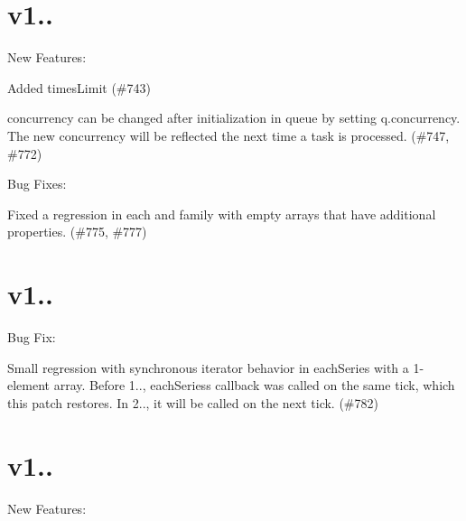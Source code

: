 \section*{v1..}

New Features\+:


\begin{DoxyItemize}
\item Added {\ttfamily times\+Limit} (\#743)
\item {\ttfamily concurrency} can be changed after initialization in {\ttfamily queue} by setting {\ttfamily q.\+concurrency}. The new concurrency will be reflected the next time a task is processed. (\#747, \#772)
\end{DoxyItemize}

Bug Fixes\+:


\begin{DoxyItemize}
\item Fixed a regression in {\ttfamily each} and family with empty arrays that have additional properties. (\#775, \#777)
\end{DoxyItemize}

\section*{v1..}

Bug Fix\+:


\begin{DoxyItemize}
\item Small regression with synchronous iterator behavior in {\ttfamily each\+Series} with a 1-\/element array. Before 1.., {\ttfamily each\+Series}\textquotesingle{}s callback was called on the same tick, which this patch restores. In 2.., it will be called on the next tick. (\#782)
\end{DoxyItemize}

\section*{v1..}

New Features\+:


